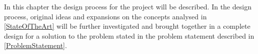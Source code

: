 In this chapter the design process for the project will be described. In the design process, original ideas and expansions on the concepts analysed in \cref{StateOfTheArt} will be further investigated and brought together in a complete design for a solution to the problem stated in the problem statement described in \cref{ProblemStatement}.
